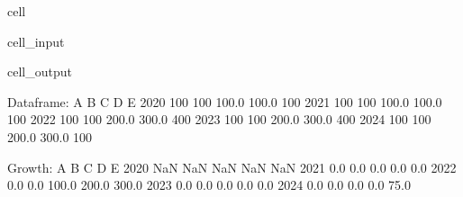 \documentclass[letterpaper,10pt,english]{jupyterBook}
\begin{document}
\begin{sphinxuseclass}{cell}\begin{sphinxVerbatimInput}

\begin{sphinxuseclass}{cell_input}
\begin{sphinxVerbatim}[commandchars=\\\{\}]
  
  
\end{sphinxVerbatim}

\end{sphinxuseclass}\end{sphinxVerbatimInput}
\begin{sphinxVerbatimOutput}

\begin{sphinxuseclass}{cell_output}
\begin{sphinxVerbatim}[commandchars=\\\{\}]
Dataframe:
        A    B      C      D    E
2020  100  100  100.0  100.0  100
2021  100  100  100.0  100.0  100
2022  100  100  200.0  300.0  400
2023  100  100  200.0  300.0  400
2024  100  100  200.0  300.0  100

Growth:
        A    B      C      D      E
2020  NaN  NaN    NaN    NaN    NaN
2021  0.0  0.0    0.0    0.0    0.0
2022  0.0  0.0  100.0  200.0  300.0
2023  0.0  0.0    0.0    0.0    0.0
2024  0.0  0.0    0.0    0.0  \PYGZhy{}75.0
\end{sphinxVerbatim}

\end{sphinxuseclass}\end{sphinxVerbatimOutput}

\end{sphinxuseclass}
\end{document}
